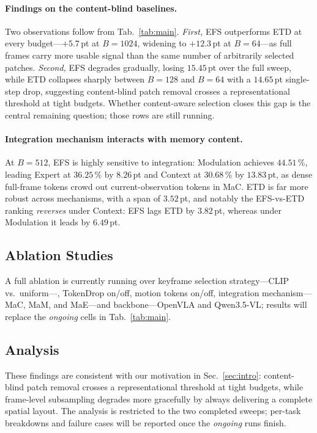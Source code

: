\documentclass{article}
\begin{document}
\paragraph{Findings on the content-blind baselines.}
Two observations follow from Tab.~\ref{tab:main}.
\emph{First,} EFS outperforms ETD at every budget---$+5.7$\,pt at $B\!=\!1024$,
widening to $+12.3$\,pt at $B\!=\!64$---as full frames carry more usable signal
than the same number of arbitrarily selected patches.
\emph{Second,} EFS degrades gradually, losing $15.45$\,pt over the full sweep,
while ETD collapses sharply between $B\!=\!128$ and $B\!=\!64$
with a $14.65$\,pt single-step drop, suggesting content-blind patch removal
crosses a representational threshold at tight budgets.
Whether content-aware selection closes this gap is the central
remaining question; those rows are still running.

\paragraph{Integration mechanism interacts with memory content.}
At $B\!=\!512$, EFS is highly sensitive to integration: Modulation achieves $44.51$\,\%, leading
Expert at $36.25$\,\% by $8.26$\,pt and Context at $30.68$\,\% by $13.83$\,pt, as dense
full-frame tokens crowd out current-observation tokens in MaC.
ETD is far more robust across mechanisms, with a span of $3.52$\,pt, and notably the
EFS-vs-ETD ranking \emph{reverses} under Context: EFS lags ETD by $3.82$\,pt, whereas
under Modulation it leads by $6.49$\,pt.

\subsection{Ablation Studies}
\label{sec:ablation}

A full ablation is currently running over keyframe selection strategy---CLIP vs.\ uniform---,
TokenDrop on/off, motion tokens on/off,
integration mechanism---MaC, MaM, and MaE---and backbone---OpenVLA and Qwen3.5-VL;
results will replace the \textit{ongoing} cells in Tab.~\ref{tab:main}.

\subsection{Analysis}
\label{sec:analysis}

These findings are consistent with our motivation in Sec.~\ref{sec:intro}:
content-blind patch removal crosses a representational threshold at tight
budgets, while frame-level subsampling degrades more gracefully by always
delivering a complete spatial layout. The analysis is restricted to the
two completed sweeps; per-task breakdowns and failure cases will be
reported once the \textit{ongoing} runs finish.
\end{document}

